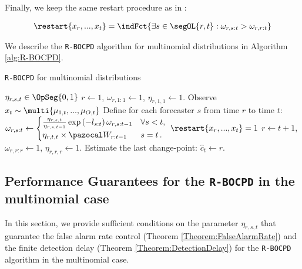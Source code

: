 \documentclass{article} %
\begin{document}
Finally, we keep the same restart procedure as in \cite{alami20a}:

\begin{align}
\restart{x_r,...,x_t} =  \indFct{ \exists s \in \segOL{r,t}:\omega_{r,s:t} >  \omega_{r,r:t}}
\label{eq::Restart}
\end{align}


We describe the \texttt{R-BOCPD} algorithm for multinomial distributions in Algorithm \ref{alg:R-BOCPD}.

\begin{algorithm}[H]
	\caption{\texttt{R-BOCPD} for multinomial distributions} \label{alg:R-BOCPD}
	\begin{algorithmic}[1]
		\REQUIRE $\eta_{r,s,t}\in \OpSeg{0,1}$
     \STATE $r \leftarrow 1$, $\omega_{r,1:1} \leftarrow 1$, $\eta_{r,1,1} \leftarrow 1$.
		\STATE Observe $x_t \sim \multi{\mu_{1,t},..., \mu_{O,t}}$
		\STATE Define for each forecaster $s$ from time $r$ to time $t$:
		$
		\omega_{r,s:t}  \leftarrow \begin{cases}
		\frac{\eta_{r,s,t}}{\eta_{r,s,t-1}}	 \exp \left(-l_{s:t} \right) \omega_{r,s:t-1} & \forall s<t,\\
			\eta_{r,t,t} \times \pW_{r:t-1} & s=t\,.
		\end{cases}
        $
        \STATE {} {$\restart{x_r,...,x_t} = 1$}  $r \leftarrow t+1$, $\omega_{r,r:r} \leftarrow 1$, $\eta_{r,r,r} \leftarrow 1$. 
		\STATE Estimate the last change-point: $\hat{c}_t \leftarrow r$.
		\ENDFOR
	\end{algorithmic}
\end{algorithm}



\subsection{Performance Guarantees for the \texttt{R-BOCPD} in the multinomial case}
In this section, we provide sufficient conditions on the parameter $\eta_{r,s,t}$ that guarantee the false alarm rate control (Theorem \ref{Theorem:FalseAlarmRate}) and the finite detection delay (Theorem \ref{Theorem:DetectionDelay}) for the \texttt{R-BOCPD} algorithm in the multinomial case.
\end{document}
